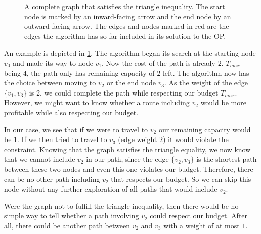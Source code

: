 \begin{figure}
  \centering
  \caption{A complete graph that satisfies the triangle inequality. 
  The start node is marked by an inward-facing arrow and the end node by an outward-facing arrow. 
  The edges and nodes marked in red are the edges the algorithm has so far included in its solution to the OP.}
  \label{fig:02:example_triangle}
\end{figure}

An example is depicted in \cref{fig:02:example_triangle}. The algorithm began its search at the starting node $v_0$ and made its way to node $v_1$.
Now the cost of the path is already $2$. $T_{max}$ being $4$, the path only has remaining capacity of $2$ left.
The algorithm now has the choice between moving to $v_2$ or the end node $v_3$. As the weight of the edge $\{v_1, v_3\}$ is $2$, we could complete the path while respecting our budget $T_{max}$.
However, we might want to know whether a route including $v_2$ would be more profitable while also respecting our budget.

In our case, we see that if we were to travel to $v_2$ our remaining capacity would be $1$.
If we then tried to travel to $v_3$ (edge weight $2$) it would violate the constraint.
Knowing that the graph satisfies the triangle equality, we now know that we cannot include $v_2$ in our path, since the edge $\{v_2, v_3\}$ is the shortest path between these two nodes and even this one violates our budget.
Therefore, there can be no other path including $v_2$ that respects our budget. 
So we can skip this node without any further exploration of all paths that would include $v_2$. 

Were the graph not to fulfill the triangle inequality, then there would be no simple way to tell whether a path involving $v_2$ could respect our budget.
After all, there could be another path between $v_2$ and $v_3$ with a weight of at most $1$.


